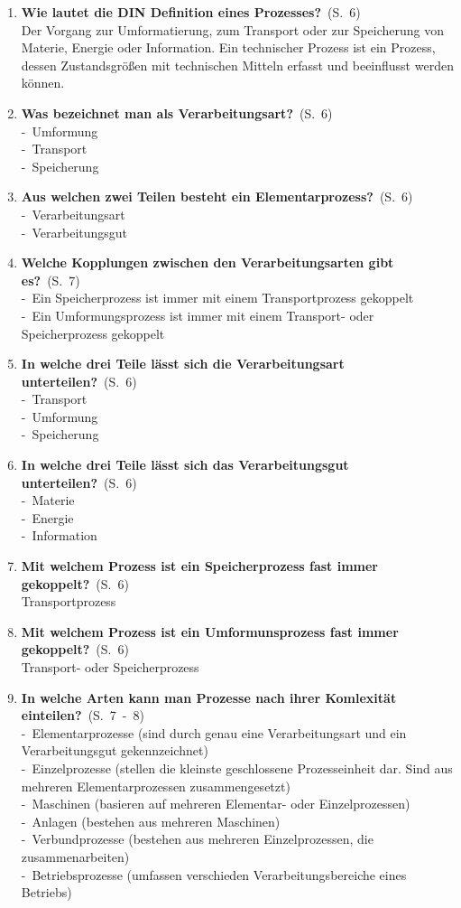 \documentclass[a4paper,12pt]{article}
\newcommand{\question}[3]{\pagebreak[3]\item {\textbf{#1?}}\ (S.\ #2)#3}
\newcommand{\catchword}[1]{\\-\ #1}
\newcommand{\normaltext}[1]{\\#1}
\newcommand{\page}[1]{#1}
\newcommand{\pages}[2]{#1\ -\ #2}
\begin{document}
\begin{enumerate}
  \question{Wie lautet die DIN Definition eines Prozesses}{\page{6}}
  {
    \normaltext{Der Vorgang zur Umformatierung, zum Transport oder zur Speicherung von Materie,
                Energie oder Information. Ein technischer Prozess ist ein Prozess, dessen
                Zustandsgrößen mit technischen Mitteln erfasst und beeinflusst werden können.}
  }

  \question{Was bezeichnet man als Verarbeitungsart}{\page{6}}
  {
    \catchword{Umformung}
    \catchword{Transport}
    \catchword{Speicherung}
  }

  \question{Aus welchen zwei Teilen besteht ein Elementarprozess}{\page{6}}
  {
    \catchword{Verarbeitungsart}
    \catchword{Verarbeitungsgut}
  }

  \question{Welche Kopplungen zwischen den Verarbeitungsarten gibt es}{\page{7}}
  {
    \catchword{Ein Speicherprozess ist immer mit einem Transportprozess gekoppelt}
    \catchword{Ein Umformungsprozess ist immer mit einem Transport- oder Speicherprozess gekoppelt}
  }

  \question{In welche drei Teile lässt sich die Verarbeitungsart unterteilen}{\page{6}}
  {
    \catchword{Transport}
    \catchword{Umformung}
    \catchword{Speicherung}
  }

  \question{In welche drei Teile lässt sich das Verarbeitungsgut unterteilen}{\page{6}}
  {
    \catchword{Materie}
    \catchword{Energie}
    \catchword{Information}
  }

  \question{Mit welchem Prozess ist ein Speicherprozess fast immer gekoppelt}{\page{6}}
  {
    \normaltext{Transportprozess}
  }

  \question{Mit welchem Prozess ist ein Umformunsprozess fast immer gekoppelt}{\page{6}}
  {
    \normaltext{Transport- oder Speicherprozess}
  }

  \question{In welche Arten kann man Prozesse nach ihrer Komlexität einteilen}{\pages{7}{8}}
  {
    \catchword{Elementarprozesse (sind durch genau eine Verarbeitungsart und ein 
    Verarbeitungsgut gekennzeichnet)}
    \catchword{Einzelprozesse (stellen die kleinste geschlossene Prozesseinheit dar.
       Sind aus mehreren Elementarprozessen zusammengesetzt)}
    \catchword{Maschinen (basieren auf mehreren Elementar- oder Einzelprozessen)}
    \catchword{Anlagen (bestehen aus mehreren Maschinen)}
    \catchword{Verbundprozesse (bestehen aus mehreren Einzelprozessen, die zusammenarbeiten)}
    \catchword{Betriebsprozesse (umfassen verschieden Verarbeitungsbereiche eines Betriebs)}
  }


\end{enumerate}
\end{document}
